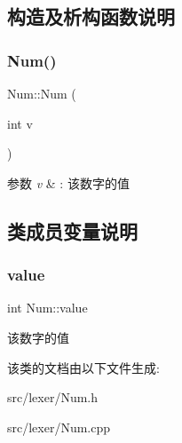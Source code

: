 \subsection{构造及析构函数说明}
\mbox{\label{class_num_afc0c5a6bc449547b300aa036e70eda2d}} 
\subsubsection{\texorpdfstring{Num()}{Num()}}
{\footnotesize\ttfamily Num\+::\+Num (\begin{DoxyParamCaption}\item[{int}]{v }\end{DoxyParamCaption})}


\begin{DoxyParams}{参数}
{\em v} & \+: 该数字的值 \\
\hline
\end{DoxyParams}


\subsection{类成员变量说明}
\mbox{\label{class_num_a40cb04ca1ed295495a2e4b358b984fb8}} 
\subsubsection{\texorpdfstring{value}{value}}
{\footnotesize\ttfamily int Num\+::value}

该数字的值 

该类的文档由以下文件生成\+:\begin{DoxyCompactItemize}
\item 
src/lexer/Num.\+h\item 
src/lexer/Num.\+cpp\end{DoxyCompactItemize}

